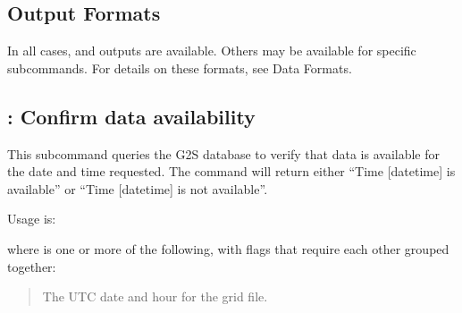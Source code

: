 \documentclass[letterpaper,10pt,english]{sphinxmanual}
\begin{document}
\subsection{Output Formats}
\label{\detokenize{userguide:output-formats}}
\sphinxAtStartPar
In all cases,  and  outputs are available.  Others may be available for specific subcommands.  For details on these formats, see Data Formats.


\subsection{: Confirm data availability}
\label{\detokenize{userguide:checktime-confirm-data-availability}}
\sphinxAtStartPar
This subcommand queries the G2S database to verify that data is available for the date and time requested.  The command will return either “Time {[}datetime{]} is available” or “Time {[}datetime{]} is not available”.

\sphinxAtStartPar
Usage is:

\sphinxAtStartPar
{}

\sphinxAtStartPar
where \sphinxcode{\sphinxupquote{{[}flags{]}}} is one or more of the following, with flags that require each other grouped together:

\sphinxAtStartPar
{}
\begin{quote}

\sphinxAtStartPar
The UTC date and hour for the grid file.
\end{quote}
\begin{description}
\item[{}] \leavevmode
\sphinxAtStartPar
{}

\sphinxAtStartPar
{}

\end{description}
\end{document}
